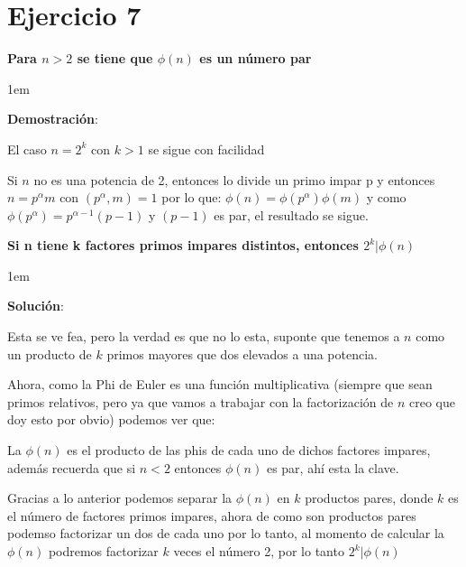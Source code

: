 \documentclass[12pt, fleqn]{article}                             %
\newenvironment{SmallIndentation}[1][0.75em]                    %
    {\begin{adjustwidth}{#1}{}\begin{footnotesize}}                 %
    {\end{footnotesize}\end{adjustwidth}}                           %
\begin{document}
\clearpage
\section{Ejercicio 7}

    \textbf{Para $n > 2$ se tiene que $\phi(n)$ es un número par}
                
        \begin{SmallIndentation}[1em]
            \textbf{Demostración}:

            El caso $n = 2^k$ con $k > 1$ se sigue con facilidad

            Si $n$ no es una potencia de 2, entonces lo divide un
            primo impar p y entonces $n = p^\alpha m$ con $(p^\alpha, m) = 1$
            por lo que:
            $\phi(n) = \phi(p^\alpha)\phi(m)$ y como
            $\phi(p^\alpha) = p^{\alpha-1}(p-1)$ y $(p-1)$ es par, el resultado se sigue.

        \end{SmallIndentation}

    \textbf{Si n tiene k factores primos impares distintos, entonces $2^k|\phi(n)$}

    \begin{SmallIndentation}[1em]
        \textbf{Solución}:
        
        Esta se ve fea, pero la verdad es que no lo esta, suponte que tenemos a $n$
        como un producto de $k$ primos mayores que dos elevados a una potencia.

        Ahora, como la Phi de Euler es una función multiplicativa (siempre que sean
        primos relativos, pero ya que vamos a trabajar con la factorización de $n$ creo que doy esto
        por obvio) podemos ver que:

        La $\phi(n)$ es el producto de las phis de cada uno de dichos factores impares,
        además recuerda que si $n < 2$ entonces $\phi(n)$ es par, ahí esta la clave.

        Gracias a lo anterior podemos separar la $\phi(n)$ en $k$ productos pares, donde $k$ es el número
        de factores primos impares, ahora de como son productos pares podemso factorizar un dos de cada uno 
        por lo tanto, al momento de calcular la $\phi(n)$ podremos factorizar $k$ veces el número 2,
        por lo tanto $2^k|\phi(n)$         
    
    \end{SmallIndentation}
\end{document}
